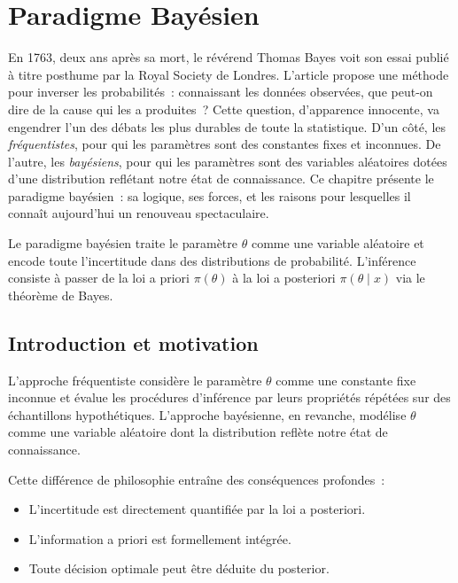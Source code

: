 \chapter{Paradigme Bay\'esien}
\label{ch:paradigme}

En 1763, deux ans apr\`es sa mort, le r\'ev\'erend Thomas Bayes voit son
essai publi\'e \`a titre posthume par la Royal Society de Londres. L'article
propose une m\'ethode pour inverser les probabilit\'es~: connaissant les
donn\'ees observ\'ees, que peut-on dire de la cause qui les a produites~?
Cette question, d'apparence innocente, va engendrer l'un des d\'ebats les
plus durables de toute la statistique. D'un c\^ot\'e, les
\emph{fr\'equentistes}, pour qui les param\`etres sont des constantes fixes
et inconnues. De l'autre, les \emph{bay\'esiens}, pour qui les param\`etres
sont des variables al\'eatoires dot\'ees d'une distribution refl\'etant notre
\'etat de connaissance. Ce chapitre pr\'esente le paradigme bay\'esien~: sa
logique, ses forces, et les raisons pour lesquelles il conna\^it
aujourd'hui un renouveau spectaculaire.

\begin{intuition}[title=\textbf{Id\'ee centrale}]
Le paradigme bay\'esien traite le param\`etre $\theta$ comme une variable
al\'eatoire et encode toute l'incertitude dans des distributions de
probabilit\'e. L'inf\'erence consiste \`a passer de la loi a priori
$\pi(\theta)$ \`a la loi a posteriori $\pi(\theta \mid x)$ via le
th\'eor\`eme de Bayes.
\end{intuition}

\section{Introduction et motivation}

L'approche fr\'equentiste consid\`ere le param\`etre $\theta$ comme une
constante fixe inconnue et \'evalue les proc\'edures d'inf\'erence par
leurs propri\'et\'es r\'ep\'et\'ees sur des \'echantillons hypoth\'etiques.
L'approche bay\'esienne, en revanche, mod\'elise $\theta$ comme une
variable al\'eatoire dont la distribution refl\`ete notre \'etat de
connaissance.

Cette diff\'erence de philosophie entra\^ine des cons\'equences profondes~:
\begin{itemize}
  \item L'incertitude est directement quantifi\'ee par la loi a posteriori.
  \item L'information a priori est formellement int\'egr\'ee.
  \item Toute d\'ecision optimale peut \^etre d\'eduite du posterior.
\end{itemize}

